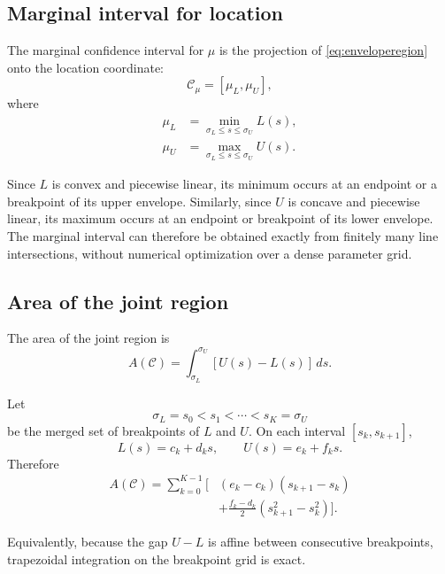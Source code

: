 \documentclass[11pt]{article}
\newcommand{\cC}{\mathcal{C}}
\begin{document}
\subsection{Marginal interval for location}

The marginal confidence interval for $\mu$ is the projection of
\eqref{eq:enveloperegion} onto the location coordinate:
\begin{equation}
    \cC_\mu
    =
    [\mu_L,\mu_U],
\end{equation}
where
\begin{align}
    \mu_L
    &=
    \min_{\sigma_L\leq s\leq\sigma_U}
    L(s),
    \label{eq:mul}
    \\
    \mu_U
    &=
    \max_{\sigma_L\leq s\leq\sigma_U}
    U(s).
    \label{eq:muu}
\end{align}

Since $L$ is convex and piecewise linear, its minimum occurs at an
endpoint or a breakpoint of its upper envelope.  Similarly, since
$U$ is concave and piecewise linear, its maximum occurs at an endpoint
or breakpoint of its lower envelope.  The marginal interval can
therefore be obtained exactly from finitely many line intersections,
without numerical optimization over a dense parameter grid.


\subsection{Area of the joint region}

The area of the joint region is
\begin{equation}
    A(\cC)
    =
    \int_{\sigma_L}^{\sigma_U}
    \left[
        U(s)-L(s)
    \right]\,ds.
    \label{eq:area}
\end{equation}

Let
\[
    \sigma_L=s_0<s_1<\cdots<s_K=\sigma_U
\]
be the merged set of breakpoints of $L$ and $U$.  On each interval
$[s_k,s_{k+1}]$,
\[
    L(s)=c_k+d_ks,
    \qquad
    U(s)=e_k+f_ks.
\]
Therefore
\begin{align}
    A(\cC)
    =
    \sum_{k=0}^{K-1}
    \Bigg[
        &(e_k-c_k)(s_{k+1}-s_k)
        \nonumber\\
        &+
        \frac{f_k-d_k}{2}
        \left(
            s_{k+1}^2-s_k^2
        \right)
    \Bigg].
    \label{eq:areaexact}
\end{align}

Equivalently, because the gap $U-L$ is affine between consecutive
breakpoints, trapezoidal integration on the breakpoint grid is exact.
\end{document}
